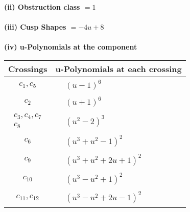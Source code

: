 \documentclass[1p]{elsarticle_modified}
\theoremstyle{definition}
\begin{document}
\flushleft \textbf{(ii) Obstruction class $= 1$}\\~\\
\flushleft \textbf{(iii) Cusp Shapes $= -4 u+8$}\\~\\
\newpage\renewcommand{\arraystretch}{1}
\flushleft \textbf{(iv) u-Polynomials at the component}\newline \\
\begin{tabular}{m{50pt}|m{274pt}}
Crossings & \hspace{64pt}u-Polynomials at each crossing \\
\hline $$\begin{aligned}c_{1},c_{5}\end{aligned}$$&$\begin{aligned}
&(u-1)^6
\end{aligned}$\\
\hline $$\begin{aligned}c_{2}\end{aligned}$$&$\begin{aligned}
&(u+1)^6
\end{aligned}$\\
\hline $$\begin{aligned}c_{3},c_{4},c_{7}\\c_{8}\end{aligned}$$&$\begin{aligned}
&(u^2-2)^3
\end{aligned}$\\
\hline $$\begin{aligned}c_{6}\end{aligned}$$&$\begin{aligned}
&(u^3+u^2-1)^2
\end{aligned}$\\
\hline $$\begin{aligned}c_{9}\end{aligned}$$&$\begin{aligned}
&(u^3+u^2+2 u+1)^2
\end{aligned}$\\
\hline $$\begin{aligned}c_{10}\end{aligned}$$&$\begin{aligned}
&(u^3- u^2+1)^2
\end{aligned}$\\
\hline $$\begin{aligned}c_{11},c_{12}\end{aligned}$$&$\begin{aligned}
&(u^3- u^2+2 u-1)^2
\end{aligned}$\\
\hline
\end{tabular}\\~\\
\end{document}
